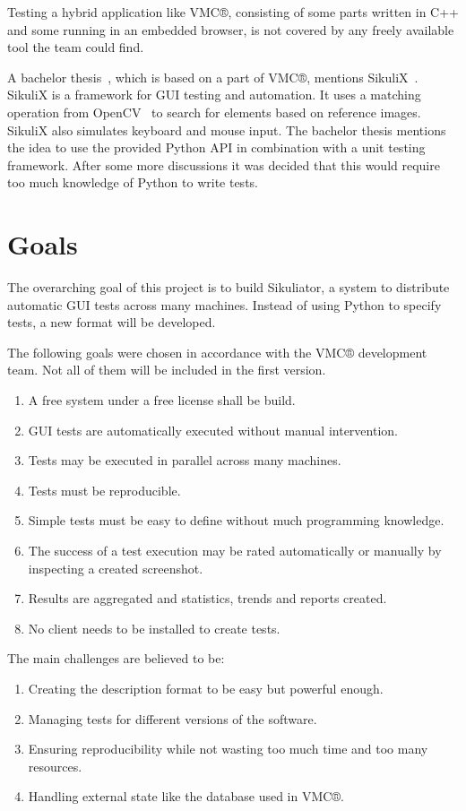 \documentclass[a4paper,twocolumn,twoside]{article}
\newcommand{\VMC}[0]{VMC®}
\newcommand{\Sik}[0]{Sikuliator}
\begin{document}
Testing a hybrid application like \VMC{}, consisting of some parts written in C++ and some running in an embedded browser, is not covered by any freely available tool the team could find.

A bachelor thesis~\cite{BachelorMapViewer}, which is based on a part of \VMC{}, mentions SikuliX~\cite{SikuliX}.
SikuliX is a framework for GUI testing and automation.
It uses a matching operation from OpenCV~\cite{OpenCV} to search for elements based on reference images.
SikuliX also simulates keyboard and mouse input.
The bachelor thesis mentions the idea to use the provided Python API in combination with a unit testing framework.
After some more discussions it was decided that this would require too much knowledge of Python to write tests.

\section{Goals}
The overarching goal of this project is to build \Sik{}, a system to distribute automatic GUI tests across many machines.
Instead of using Python to specify tests, a new format will be developed.


The following goals were chosen in accordance with the \VMC{} development team.
Not all of them will be included in the first version.
\begin{enumerate}
	\item A free system under a free license shall be build.
	\item GUI tests are automatically executed without manual intervention.
	\item Tests may be executed in parallel across many machines.
	\item Tests must be reproducible.
	\item Simple tests must be easy to define without much programming knowledge.
	\item The success of a test execution may be rated automatically or manually by inspecting a created screenshot.
	\item Results are aggregated and statistics, trends and reports created.
	\item No client needs to be installed to create tests.
\end{enumerate}



The main challenges are believed to be:
\begin{enumerate}
	\item Creating the description format to be easy but powerful enough.
	\item Managing tests for different versions of the software.
	\item Ensuring reproducibility while not wasting too much time and too many resources.
	\item Handling external state like the database used in \VMC{}.
\end{enumerate}
\end{document}
